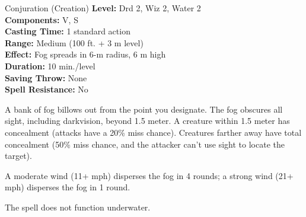 {Conjuration (Creation)}
{
	\textbf{Level:}
	Drd 2, Wiz 2, Water 2\\
	\textbf{Components:}
	V, S\\
	\textbf{Casting Time:}
	1 standard action\\
	\textbf{Range:}
	Medium (100 ft. + 3 m level)\\
	\textbf{Effect:}
	Fog spreads in 6-m radius, 6 m high\\
	\textbf{Duration:}
	10 min./level\\
	\textbf{Saving Throw:}
	None\\
	\textbf{Spell Resistance:}
	No\\
}
{
	A bank of fog billows out from the point you designate. The fog obscures all sight, including darkvision, beyond 1.5 meter. A creature within 1.5 meter has concealment (attacks have a 20\% miss chance). Creatures farther away have total concealment (50\% miss chance, and the attacker can't use sight to locate the target).

	A moderate wind (11+ mph) disperses the fog in 4 rounds; a strong wind (21+ mph) disperses the fog in 1 round.

	The spell does not function underwater.

}
